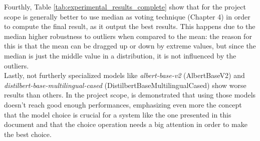 \documentclass[\main/main.tex]{subfiles}
\begin{document}
Fourthly, Table \ref{tab:experimental_results_complete} show that for the project scope is generally better to use median as voting technique (Chapter 4) in order to compute the final result, as it output the best results. This happens due to the median higher robustness to outliers when compared to the mean: the reason for this is that the mean can be dragged up or down by extreme values, but since the median is just the middle value in a distribution, it is not influenced by the outliers.\\
Lastly, not furtherly specialized models like \emph{albert-base-v2} (AlbertBaseV2) and \emph{distilbert-base-multilingual-cased} (DistilbertBaseMultilingualCased) show worse results than others. In the project scope, is demonstrated that using those models doesn't reach good enough performances, emphasizing even more the concept that the model choice is crucial for a system like the one presented in this document and that the choice operation needs a big attention in order to make the best choice. 
\newpage
\end{document}
